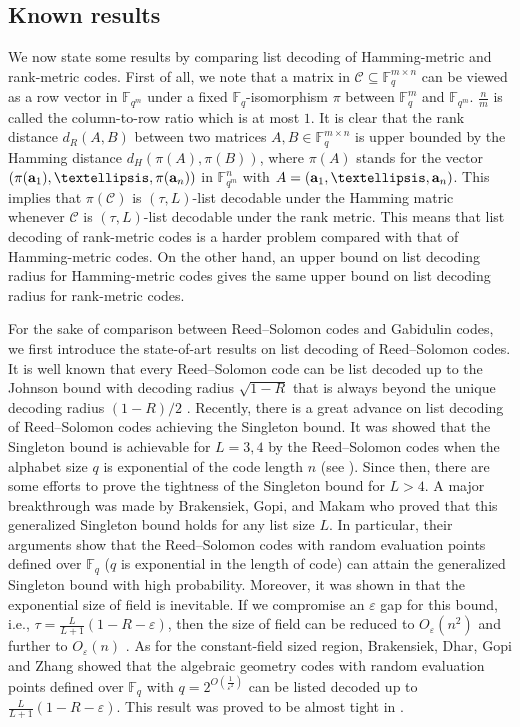 \documentclass[11pt]{article}
\theoremstyle{plain}
\theoremstyle{definition}
\theoremstyle{remark}
\newcommand{\F}{\mathbb{F}}
\renewcommand{\epsilon}{\varepsilon}
\def \mC {\mathcal{C}}
\def \mC {\mathcal{C}}
\begin{document}
\subsection{Known results}\label{subsec:1.1}
We now state some results by comparing list decoding of  Hamming-metric and rank-metric codes. First of all, we note that a matrix in $\mC\subseteq\F_q^{m\times n}$ can be viewed as a row vector in $\F_{q^m}$ under a fixed $\F_q$-isomorphism $\pi$ between $\F_q^m$ and $\F_{q^m}$. $\frac{n}{m}$ is called the column-to-row ratio which is at most $1$.
It is clear that the rank distance $d_R(A,B)$ between two matrices $A,B\in \F_q^{m\times n}$ is upper bounded by the Hamming distance $d_H(\pi(A),\pi(B))$, where $\pi(A)$ stands for the vector $(\pi({\bf a}_1),\dots,\pi({\bf a}_n))$ in $\F_{q^m}^n$ with $A=({\bf a}_1,\dots,{\bf a}_n)$. This implies that $\pi(\mC)$  is $(\tau, L)$-list decodable under the Hamming matric whenever $\mC$ is $(\tau, L)$-list decodable under the rank metric. This means that list decoding of rank-metric codes is a harder problem compared with that of Hamming-metric codes. On the other hand, an upper bound on list decoding radius for Hamming-metric codes gives the same upper bound on list decoding radius for rank-metric codes.
 


For the sake of comparison between Reed--Solomon codes and Gabidulin codes, we first introduce the state-of-art results on list decoding of Reed--Solomon codes. It is  well known  that every Reed--Solomon code can be list decoded up to the Johnson bound with decoding radius $\sqrt{1-R}$ that is always beyond the unique decoding radius  $(1-R)/2$ \cite{Gu02}. Recently, there is a great advance on list decoding of Reed--Solomon codes achieving the Singleton bound.
 It was showed that the Singleton bound is achievable for $L=3,4$ by the Reed--Solomon codes when the alphabet size $q$ is exponential of the code length $n$ (see \cite{shangguan2020combinatorial}). Since then, there are some efforts to prove the tightness of the Singleton bound \cite{GSTW21,FKS22,GST23} for $L>4$. A major breakthrough was made by Brakensiek, Gopi, and Makam \cite{brakensiek2023generic} who proved that this generalized Singleton bound holds for any list size $L$. In particular, their arguments show that the Reed--Solomon codes with random evaluation points defined over $\F_q$ ($q$ is exponential in the length of code) can attain the generalized Singleton bound with high probability. Moreover, it was shown in \cite{brakensiek2022lower} that
the exponential size of field is inevitable. If we compromise an $\epsilon$ gap for this bound, i.e., $\tau=\frac{L}{L+1}(1-R-\epsilon)$, then the size of field can be reduced to $O_{\epsilon}(n^2)$ \cite{guo2023randomly} and further to $O_{\epsilon}(n)$ \cite{alrabiah2023randomly}. As for the constant-field sized region, Brakensiek, Dhar, Gopi and Zhang \cite{brakensiek2023ag} showed that the algebraic geometry codes with random evaluation points defined over $\F_q$ with $q=2^{O\left(\frac{1}{\epsilon^2}\right)}$ can be listed decoded up to $\frac{L}{L+1}(1-R-\epsilon)$.
This result was proved to be almost tight in \cite{alrabiah2023ag}.
\end{document}
